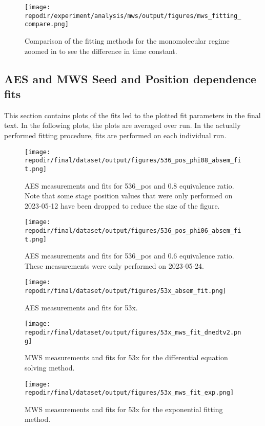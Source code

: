 \begin{figure}
\centering
\texttt{[image: \\repodir/experiment/analysis/mws/output/figures/mws\_fitting\_compare.png]}
\caption{Comparison of the fitting methods for the monomolecular regime zoomed in to see the difference in time constant. }
\label{fig:SI_mws_fitting_compare}
\end{figure}

\subsection{AES and MWS Seed and Position dependence fits}

This section contains plots of the fits led to the plotted fit parameters in the final text. In the following plots, the plots are averaged over run. In the actually performed fitting procedure, fits are performed on each individual run. 

\begin{figure}[]
\centering
\texttt{[image: \\repodir/final/dataset/output/figures/536\_pos\_phi08\_absem\_fit.png]}
\caption{AES measurements and fits for 536\_pos and 0.8 equivalence ratio. Note that some stage position values that were only performed on 2023-05-12 have been dropped to reduce the size of the figure. }
\label{fig:SI_536_pos_phi08_absem_fit}
\end{figure}

\begin{figure}[]
\centering
\texttt{[image: \\repodir/final/dataset/output/figures/536\_pos\_phi06\_absem\_fit.png]}
\caption{AES measurements and fits for 536\_pos and 0.6 equivalence ratio. These measurements were only performed on 2023-05-24.}
\label{fig:SI_536_pos_phi06_absem_fit}
\end{figure}

\begin{figure}[]
\centering
\texttt{[image: \\repodir/final/dataset/output/figures/53x\_absem\_fit.png]}
\caption{AES measurements and fits for 53x.}
\label{fig:SI_53x_absem_fit}
\end{figure}

\begin{figure}[]
\centering
\texttt{[image: \\repodir/final/dataset/output/figures/53x\_mws\_fit\_dnedtv2.png]}
\caption{MWS measurements and fits for 53x for the differential equation solving method. }
\label{fig:SI_53x_mws_fit_dnedtv2}
\end{figure}

\begin{figure}[]
\centering
\texttt{[image: \\repodir/final/dataset/output/figures/53x\_mws\_fit\_exp.png]}
\caption{MWS measurements and fits for 53x for the exponential fitting method. }
\label{fig:SI_53x_mws_fit_exp}
\end{figure}

